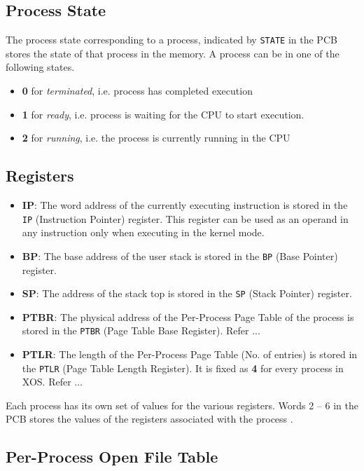 \documentclass[10pt]{report}
\begin{document}
	 \subsection{Process State} 
	 The process state corresponding to a process, indicated by \texttt{STATE} in the PCB stores the state of that process in the memory. A process can be in one of the following states. 
	\begin{itemize}
		\item \textbf{0} for \textit{terminated}, i.e. process has completed execution
		\item \textbf{1} for \textit{ready}, i.e. process is waiting for the CPU to start execution.
		\item \textbf{2} for \textit{running}, i.e. the process is currently running in the CPU
	\end{itemize}
	
	  \subsection{Registers} 
\begin{itemize}
	\item \textbf{IP}: The word address of the currently executing instruction is stored in the \texttt{IP} (Instruction Pointer) register. This register can be used as an operand in any instruction only when executing in the kernel mode.
	\item \textbf{BP}:   The base address of the user stack is stored in the \texttt{BP} (Base Pointer) register. 
	\item \textbf{SP}: The address of the stack top is stored in the \texttt{SP} (Stack Pointer) register. 
	\item \textbf{PTBR}: The physical address of the Per-Process Page Table of the process is stored in the \texttt{PTBR} (Page Table Base Register). Refer ...
	\item  \textbf{PTLR}: The length of the Per-Process Page Table (No. of entries) is stored in the \texttt{PTLR} (Page Table Length Register). It is fixed as \textbf{4} for every process in XOS. Refer ... 
	
\end{itemize}
Each process has its own set of values for the various registers. Words  2	 -- 6 in the PCB stores the values of the registers associated with the process .
	
\subsection{Per-Process Open File Table} 
	 
\end{document}
